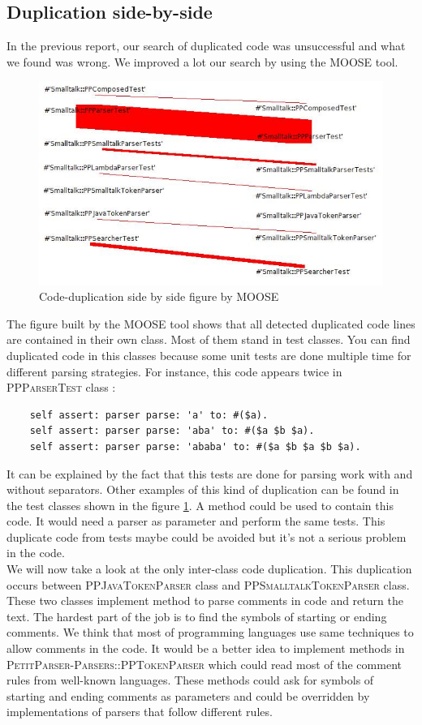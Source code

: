 \subsection{Duplication side-by-side}
In the previous report, our search of duplicated code was unsuccessful and what we found was wrong. We improved a lot our search by using the \textsc{MOOSE} tool. 
\begin{figure}[ht!]
\label{code-duplication}
\centering \includegraphics[scale=0.6]{duplication.jpg}
\caption{Code-duplication side by side figure by \textsc{MOOSE}}
\end{figure}
The figure built by the \textsc{MOOSE} tool shows that all detected duplicated code lines are contained in their own class. Most of them stand in test classes. You can find duplicated code in this classes because some unit tests are done multiple time for different parsing strategies. For instance, this code appears twice in \textsc{PPParserTest} class :
\begin{lstlisting}
	self assert: parser parse: 'a' to: #($a).
	self assert: parser parse: 'aba' to: #($a $b $a).
	self assert: parser parse: 'ababa' to: #($a $b $a $b $a).
\end{lstlisting}
It can be explained by the fact that this tests are done for parsing work with and without separators. Other examples of this kind of duplication can be found in the test classes shown in the figure \ref{code-duplication}. A method could be used to contain this code. It would need a parser as parameter and perform the same tests. This duplicate code from tests maybe could be avoided but it's not a serious problem in the code.\\
We will now take a look at the only inter-class code duplication. This duplication occurs between \textsc{PPJavaTokenParser} class and \textsc{PPSmalltalkTokenParser} class. These two classes implement method to parse comments in code and return the text. The hardest part of the job is to find the symbols of starting or ending comments. We think that most of programming languages use same techniques to allow comments in the code. It would be a better idea to implement methods in \textsc{PetitParser-Parsers::PPTokenParser} which could read most of the comment rules from well-known languages. These methods could ask for symbols of starting and ending comments as parameters and could be overridden by implementations of parsers that follow different rules.
